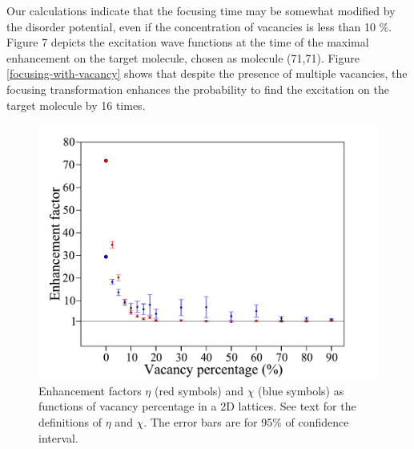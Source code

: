 Our calculations indicate that the focusing time may be somewhat modified by the disorder potential, even if the
 concentration of vacancies is less than 10 \%.  Figure 7 depicts the excitation wave functions
 at the time of the maximal enhancement on the target molecule, chosen as molecule (71,71).  Figure \ref{focusing-with-vacancy} shows that
despite the presence of multiple vacancies, the focusing transformation enhances the probability to find the
excitation on the target molecule by 16 times.



\begin{figure}[htbp]
\centering
\includegraphics[width=\linewidth]{enhancement-vs-vacancy.pdf}
\caption{ Enhancement factors $\eta$ (red symbols) and
$\chi$ (blue symbols) as functions of vacancy percentage in a 2D lattices. See text
for the definitions of $\eta$ and $\chi$. The error bars are for 95\% of confidence interval. 
} 
\label{enhancement-vs-vacancy}
\end{figure}




